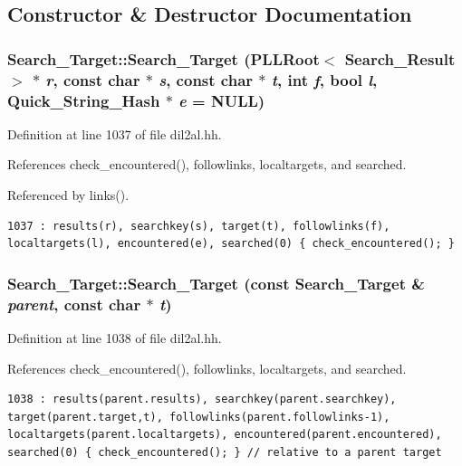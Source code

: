 \subsection{Constructor \& Destructor Documentation}
\subsubsection{\setlength{\rightskip}{0pt plus 5cm}Search\_\-Target::Search\_\-Target ({\bf PLLRoot}$<$ {\bf Search\_\-Result} $>$ $\ast$ {\em r}, const char $\ast$ {\em s}, const char $\ast$ {\em t}, int {\em f}, bool {\em l}, {\bf Quick\_\-String\_\-Hash} $\ast$ {\em e} = NULL)\hspace{0.3cm}{\tt  [inline]}}\label{classSearch__Target_a0}




Definition at line 1037 of file dil2al.hh.

References check\_\-encountered(), followlinks, localtargets, and searched.

Referenced by links().



\footnotesize\begin{verbatim}1037 : results(r), searchkey(s), target(t), followlinks(f), localtargets(l), encountered(e), searched(0) { check_encountered(); }
\end{verbatim}\normalsize 
{}
\subsubsection{\setlength{\rightskip}{0pt plus 5cm}Search\_\-Target::Search\_\-Target (const Search\_\-Target \& {\em parent}, const char $\ast$ {\em t})\hspace{0.3cm}{\tt  [inline]}}\label{classSearch__Target_a1}




Definition at line 1038 of file dil2al.hh.

References check\_\-encountered(), followlinks, localtargets, and searched.



\footnotesize\begin{verbatim}1038 : results(parent.results), searchkey(parent.searchkey), target(parent.target,t), followlinks(parent.followlinks-1), localtargets(parent.localtargets), encountered(parent.encountered), searched(0) { check_encountered(); } // relative to a parent target
\end{verbatim}\normalsize 


